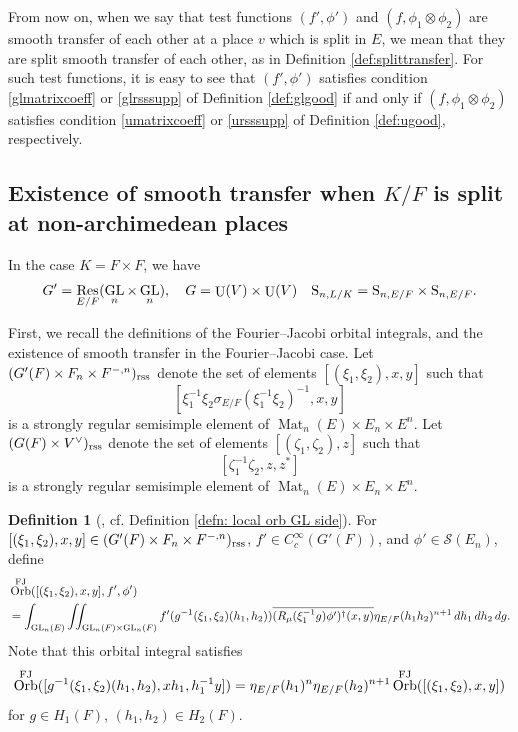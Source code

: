 \documentclass[11pt, reqno]{amsart}
\numberwithin{equation}{subsection}
\theoremstyle{plain}
\theoremstyle{definition}
\newtheorem{definition}[proposition]{Definition}
\newcommand{\ol}{\overline}
\renewcommand{\S}{\textnormal{S}}
\newcommand{\cS}{\mathcal S}
\DeclareMathOperator{\GL}{GL}
\DeclareMathOperator{\Mat}{Mat}
\DeclareMathOperator{\Orb}{Orb}
\DeclareMathOperator{\Res}{Res}
\DeclareMathOperator{\U}{U}
\newcommand{\FJ}{\textnormal{FJ}}
\newcommand{\rss}{\textnormal{rss}}
\begin{document}
From now on, when we say that test functions
$(f', \phi')$ and $(f, \phi_1 \otimes \phi_2)$ are
smooth transfer of each other at a place $v$ which
is split in $E$, we mean that they are split smooth
transfer of each other, as in Definition 
\ref{def:splittransfer}.
For such test functions,
it is easy to see that $(f', \phi')$ satisfies
condition \eqref{glmatrixcoeff} or \eqref{glrsssupp}
of Definition \ref{def:glgood}
if and only if
$(f, \phi_1 \otimes \phi_2)$ satisfies condition
\eqref{umatrixcoeff} or \eqref{ursssupp}
of Definition \ref{def:ugood}, respectively.


\subsection{Existence of smooth transfer when $K/F$ is split at non-archimedean places}
\label{sec:Ksplittransfer}

In the case $K = F \times F$, we have
\[
    G' = \Res_{E/F}(\GL_n\times \GL_n), \quad 
    G = \U(V) \times \U(V)\quad
    \S_{n, L/K} = \S_{n, E/F} \times \S_{n, E/F}.
\]

First, we recall the definitions of
the Fourier--Jacobi orbital integrals, and the
existence of smooth transfer in the Fourier--Jacobi
case.
Let $(G'(F) \times F_n \times F^{-,n})_\rss$ denote the
set of elements $[(\xi_1, \xi_2), x, y]$ such that
\[
    [\xi_1^{-1}\xi_2\sigma_{E/F}(\xi_1^{-1}\xi_2)^{-1}, x, y]
\]
is a strongly regular semisimple element of $\Mat_n(E) \times E_n \times E^n$.
Let $(G(F) \times V^\vee)_\rss$ denote the set
of elements $[(\zeta_1, \zeta_2), z]$ such that
\[
    [\zeta_1^{-1}\zeta_2, z, z^\ast]
\] 
is a strongly regular semisimple element of
$\Mat_n(E) \times E_n \times E^n$.

\begin{definition}[{\cite[(3.1.1)]{Xue-GGP}}, cf. Definition \ref{defn: local orb GL side}]

For $[(\xi_1, \xi_2), x, y] \in (G'(F)
\times F_n \times F^{-,n})_\rss$, 
$f' \in C_c^\infty(G'(F))$, 
and $\phi' \in \cS(E_n)$, define
\begin{align*}
    &\Orb^{\FJ}([(\xi_1, \xi_2), x, y], f', \phi')\\
    &= \int_{\GL_n(E)}
    \iint_{\GL_n(F)\times\GL_n(F)}
    f'(g^{-1}(\xi_1, \xi_2)(h_1, h_2))
    \ol{(R_\mu(\xi_1^{-1} g)\phi')^\dagger
    (x, y)}
    \eta_{E/F}(h_1h_2)^{n+1}\,dh_1\,dh_2\,dg.
\end{align*}
Note that this orbital integral satisfies
\[
    \Orb^{\FJ}([g^{-1}(\xi_1, \xi_2)(h_1, h_2), xh_1,
    h_1^{-1}y])
    = \eta_{E/F}(h_1)^n\eta_{E/F}(h_2)^{n+1}
    \Orb^{\FJ}([(\xi_1, \xi_2), x, y])
\]
for $g \in H_1(F)$, $(h_1, h_2) \in H_2(F)$.
\end{definition}
\end{document}
